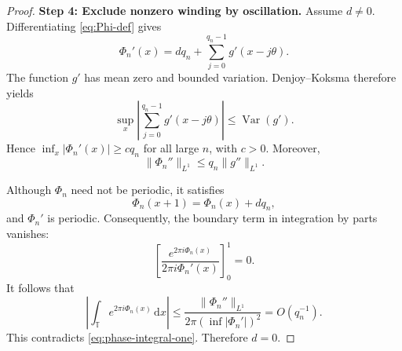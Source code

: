 \documentclass[10pt,a4paper]{amsart}
\newcommand{\T}{\mathbb{T}}
\newcommand{\Var}{\operatorname{Var}}
\newcommand{\dd}{\,\mathrm{d}}
\theoremstyle{plain}
\theoremstyle{remark}
\begin{document}
\begin{proof}
\smallskip
\noindent
\textbf{Step 4: Exclude nonzero winding by oscillation.}
Assume \(d\neq0\). Differentiating \eqref{eq:Phi-def} gives
\[
  \Phi_n'(x)
  =dq_n+\sum_{j=0}^{q_n-1}g'(x-j\theta).
\]
The function \(g'\) has mean zero and bounded variation. Denjoy--Koksma
therefore yields
\[
  \sup_x\left|
    \sum_{j=0}^{q_n-1}g'(x-j\theta)
  \right|
  \leq\Var(g').
\]
Hence \(\inf_x|\Phi_n'(x)|\geq c q_n\) for all large \(n\), with \(c>0\).
Moreover,
\[
  \|\Phi_n''\|_{L^1}
  \leq q_n\|g''\|_{L^1}.
\]

Although \(\Phi_n\) need not be periodic, it satisfies
\[
  \Phi_n(x+1)=\Phi_n(x)+dq_n,
\]
and \(\Phi_n'\) is periodic. Consequently, the boundary term in integration
by parts vanishes:
\[
  \left[
    \frac{e^{2\pi i\Phi_n(x)}}{2\pi i\Phi_n'(x)}
  \right]_{0}^{1}=0.
\]
It follows that
\[
  \left|
    \int_\T e^{2\pi i\Phi_n(x)}\dd x
  \right|
  \leq
  \frac{\|\Phi_n''\|_{L^1}}
       {2\pi(\inf|\Phi_n'|)^2}
  =O(q_n^{-1}).
\]
This contradicts \eqref{eq:phase-integral-one}. Therefore \(d=0\).
\end{proof}
\end{document}

